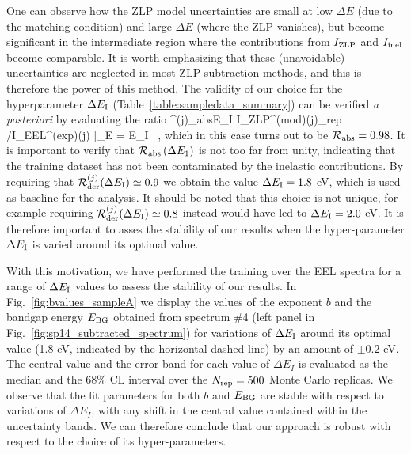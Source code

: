One can observe how the ZLP model uncertainties are small at low $\Delta E$
(due to the matching condition) and large $\Delta E$ (where the ZLP vanishes),
but become significant in the intermediate region where the contributions
from $I_{\rm ZLP}$ and $I_{\rm inel}$ become comparable.
%
It is worth emphasizing that these (unavoidable) uncertainties are neglected in most
ZLP subtraction methods, and this is therefore the power of this method.
%
The validity of our choice for the hyperparameter $\Delta E_{\rm I}$ (Table~\ref{table:sampledata_summary})
can be verified {\it a posteriori} by evaluating the ratio
\be
{}^{(j)}_{\rm abs}\lp \Delta E_{\rm I}\rp \equiv 
\la I_{\rm ZLP}^{({\rm mod})(j)}\ra_{\rm rep} \Big/I_{\rm EEL}^{({\rm exp})(j)} \Big|_{\Delta E = \Delta E_{\rm I}} \, ,
\ee
which in this case turns out to be $\mathcal{R}_{\rm abs} = 0.98$.
%
It is important to verify that $\mathcal{R}_{\rm abs}\left( \Delta E_1\right)$ is not too far from unity,
indicating that the training dataset has not been contaminated by the inelastic contributions.
%
By requiring that $\mathcal{R}^{(j)}_{\rm der}(\Delta E_{\rm I})\simeq 0.9$ we obtain
the value $\Delta E_{\rm I}=1.8$ eV, which is used as baseline for the analysis.
%
It should be noted that this choice is not unique, for example requiring
$\mathcal{R}^{(j)}_{\rm der}(\Delta E_{\rm I})\simeq 0.8$ instead would have led
to $\Delta E_{\rm I}=2.0$ eV.
%
It is therefore important to asses the stability of our results when the hyper-parameter $\Delta E_{\rm I}$
is varied around its optimal value.

With this motivation, we have performed the training over the EEL spectra 
for a range of $\Delta E_{\rm I}$ values to assess the stability of our
results.
%
In Fig.~\ref{fig:bvalues_sampleA} we display the
values of the exponent $b$
and the bandgap energy $E_{\rm BG}$ 
obtained from spectrum \#4 (left panel in Fig.~\ref{fig:sp14_subtracted_spectrum})
for variations of $\Delta E_{\rm I}$ around its optimal value
(1.8 eV, indicated by the horizontal dashed line) by an amount
of $\pm 0.2$ eV.
%
The central value and the error band for each value of $\Delta E_I$ is evaluated
as the median and the 68\% CL interval over the $N_{\rm rep}=500$ Monte Carlo replicas.
%
We observe that the fit parameters for both $b$ and $E_{\rm BG}$ are stable with respect
to variations of $\Delta E_I$, with any shift in the central value contained within the
uncertainty bands.
%
We can therefore conclude that our approach is robust with respect to the choice of its
hyper-parameters.


